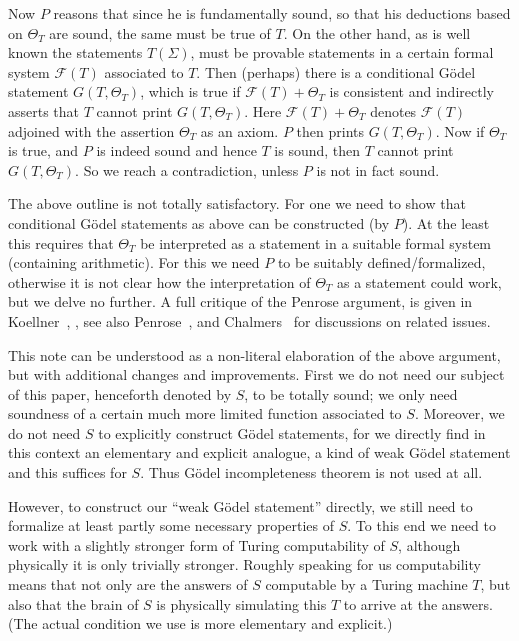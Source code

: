 \documentclass[9pt,twocolumn,twoside,lineno]{pnas-new}
\numberwithin{equation}{section}
\theoremstyle{definition}
\theoremstyle{remark}
\begin{document}
Now $P$ reasons that since he is fundamentally sound, so that his deductions based on $\Theta _{T} $ are sound, the same must be true of $T$. On the other hand, as is well known the statements $T (\Sigma)$, must be provable statements in a certain  formal system $\mathcal{F} (T)$ associated to $T$.
Then (perhaps) there is a conditional G\"odel statement $G (T, \Theta _{T} )$, which is true if $\mathcal{F}(T)+\Theta _{T} $ is consistent and indirectly asserts that $T$ cannot print $G(T,\Theta _{T}) $. Here $\mathcal{F} (T)+\Theta _{T} $ denotes $\mathcal{F} (T)$ adjoined with the assertion $\Theta _{T} $ as an axiom.  $P$ then prints $G (T, \Theta _{T} )$. 
Now if $\Theta _{T} $ is true, and $P$ is indeed sound and hence $T$ is sound,  then $T$ cannot print $G (T, \Theta _{T} )$. So we reach a contradiction, unless $P$ is not in fact sound. 

The above outline is not totally satisfactory. For one we need to show that conditional G\"odel statements as above can be constructed  (by $P$). At the least this requires that $\Theta _{T} $ be interpreted as a statement in a suitable formal system (containing arithmetic).
For this we need $P$ to be suitably defined/formalized,  otherwise it is not clear how the interpretation of $\Theta _{T} $ as a statement could work, but we delve no further. A full critique of the Penrose argument, is given in Koellner~\cite{citeKoellner2018-KOEOTQ-3}, \cite{citeKoellnerII2018-KOEOTQ-4}, see also 
 Penrose~\cite{citePenroseBeyondShadow}, and Chalmers~\cite{citeChalmers} for discussions on related issues.  
 
This note can be understood as a non-literal elaboration of the above  argument, but with additional changes and improvements. First we do not need our subject of this paper, henceforth denoted by  $S$, to be totally sound; we only need soundness of a certain much more limited function associated to $S$. Moreover, we do not need $S$ to explicitly construct G\"odel statements, for we directly find in this context an elementary and explicit analogue, a kind of weak G\"odel statement and this suffices for $S$. Thus G\"odel incompleteness theorem is not used at all.

However, to construct our ``weak G\"odel statement'' directly, we still need 
to formalize at least partly some necessary properties of $S$. To this end we need to work with a slightly stronger form of Turing computability of  $S$, although physically it is only trivially stronger.
 Roughly speaking for us computability means that not only are the answers of $S$ computable by a Turing machine $T$, but also that the brain of $S$ is physically simulating this $T$ to arrive at the answers. (The actual condition we use is more elementary and explicit.)  
 
\end{document}
